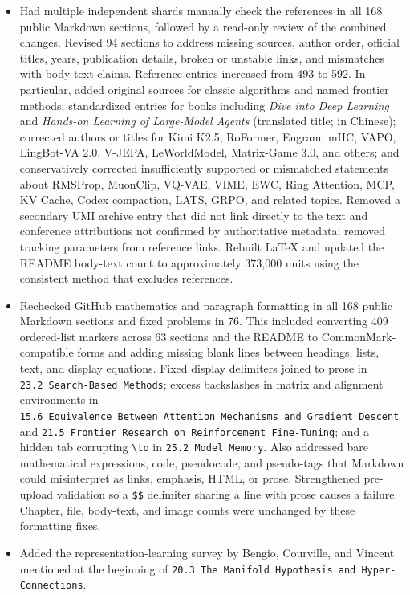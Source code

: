 \begin{itemize}
\item
  Had multiple independent shards manually check the references in all 168 public Markdown sections, followed by a read-only review of the combined changes. Revised 94 sections to address missing sources, author order, official titles, years, publication details, broken or unstable links, and mismatches with body-text claims. Reference entries increased from 493 to 592. In particular, added original sources for classic algorithms and named frontier methods; standardized entries for books including \emph{Dive into Deep Learning} and \emph{Hands-on Learning of Large-Model Agents} (translated title; in Chinese); corrected authors or titles for Kimi K2.5, RoFormer, Engram, mHC, VAPO, LingBot-VA 2.0, V-JEPA, LeWorldModel, Matrix-Game 3.0, and others; and conservatively corrected insufficiently supported or mismatched statements about RMSProp, MuonClip, VQ-VAE, VIME, EWC, Ring Attention, MCP, KV Cache, Codex compaction, LATS, GRPO, and related topics. Removed a secondary UMI archive entry that did not link directly to the text and conference attributions not confirmed by authoritative metadata; removed tracking parameters from reference links. Rebuilt LaTeX and updated the README body-text count to approximately 373,000 units using the consistent method that excludes references.
\item
  Rechecked GitHub mathematics and paragraph formatting in all 168 public Markdown sections and fixed problems in 76. This included converting 409 ordered-list markers across 63 sections and the README to CommonMark-compatible forms and adding missing blank lines between headings, lists, text, and display equations. Fixed display delimiters joined to prose in \texttt{23.2\ Search-Based\ Methods}; excess backslashes in matrix and alignment environments in \texttt{15.6\ Equivalence\ Between\ Attention\ Mechanisms\ and\ Gradient\ Descent} and \texttt{21.5\ Frontier\ Research\ on\ Reinforcement\ Fine-Tuning}; and a hidden tab corrupting \texttt{\textbackslash{}to} in \texttt{25.2\ Model\ Memory}. Also addressed bare mathematical expressions, code, pseudocode, and pseudo-tags that Markdown could misinterpret as links, emphasis, HTML, or prose. Strengthened pre-upload validation so a \texttt{\$\$} delimiter sharing a line with prose causes a failure. Chapter, file, body-text, and image counts were unchanged by these formatting fixes.
\item
  Added the representation-learning survey by Bengio, Courville, and Vincent mentioned at the beginning of \texttt{20.3\ The\ Manifold\ Hypothesis\ and\ Hyper-Connections}.

\end{itemize}
